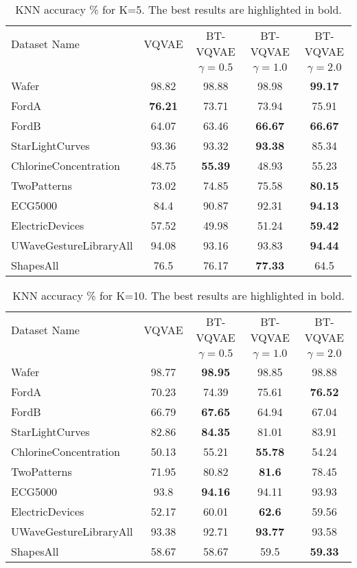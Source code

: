 \documentclass[../../thesis.tex]{subfiles}
\begin{document}
\begin{table}
    \centering
    \begin{tabular}{l c c c c}
    \toprule
    Dataset Name & VQVAE & BT-VQVAE & BT-VQVAE & BT-VQVAE \\
    & & $\gamma = 0.5$ & $\gamma = 1.0$ & $\gamma = 2.0$ \\
    \midrule
    Wafer & 98.82 & 98.88 & 98.98 & \textbf{99.17} \\
    FordA & \textbf{76.21} & 73.71 & 73.94 & 75.91 \\
    FordB & 64.07 & 63.46 & \textbf{66.67} & \textbf{66.67} \\
    StarLightCurves & 93.36 & 93.32 & \textbf{93.38} & 85.34 \\
    ChlorineConcentration & 48.75 & \textbf{55.39} & 48.93 & 55.23 \\
    TwoPatterns & 73.02 & 74.85 & 75.58 & \textbf{80.15} \\
    ECG5000 & 84.4 & 90.87 & 92.31 & \textbf{94.13} \\
    ElectricDevices & 57.52 & 49.98 & 51.24 & \textbf{59.42} \\
    UWaveGestureLibraryAll & 94.08 & 93.16 & 93.83 & \textbf{94.44} \\
    ShapesAll & 76.5 & 76.17 & \textbf{77.33} & 64.5 \\
    \bottomrule
    \end{tabular}
    \caption{KNN accuracy \% for K=5. The best results are highlighted in bold.}
    \label{tab:knn5_acc}
\end{table}

\begin{table}
    \centering
    \begin{tabular}{l c c c c}
    \toprule
    Dataset Name & VQVAE & BT-VQVAE & BT-VQVAE & BT-VQVAE \\
    & & $\gamma = 0.5$ & $\gamma = 1.0$ & $\gamma = 2.0$ \\
    \midrule
    Wafer & 98.77 & \textbf{98.95} & 98.85 & 98.88 \\
    FordA & 70.23 & 74.39 & 75.61 & \textbf{76.52} \\
    FordB & 66.79 & \textbf{67.65} & 64.94 & 67.04 \\
    StarLightCurves & 82.86 & \textbf{84.35} & 81.01 & 83.91 \\
    ChlorineConcentration & 50.13 & 55.21 & \textbf{55.78} & 54.24 \\
    TwoPatterns & 71.95 & 80.82 & \textbf{81.6} & 78.45 \\
    ECG5000 & 93.8 & \textbf{94.16} & 94.11 & 93.93 \\
    ElectricDevices & 52.17 & 60.01 & \textbf{62.6} & 59.56 \\
    UWaveGestureLibraryAll & 93.38 & 92.71 & \textbf{93.77} & 93.58 \\
    ShapesAll & 58.67 & 58.67 & 59.5 & \textbf{59.33} \\
    \bottomrule
    \end{tabular}
    \caption{KNN accuracy \% for K=10. The best results are highlighted in bold.}
    \label{tab:knn10_acc}
\end{table}
\end{document}
